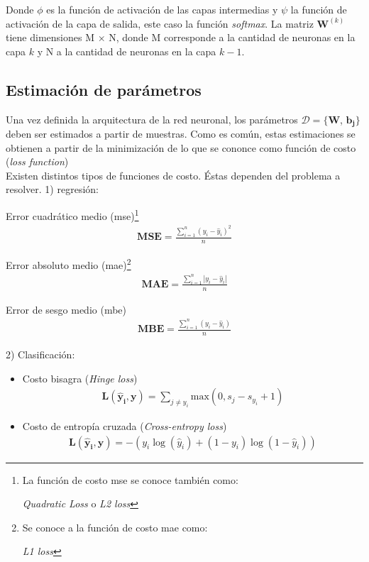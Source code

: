 \indent Donde $\phi$ es la función de activación de las capas intermedias y $\psi$ la función de activación de la
capa de salida, este caso la función \textit{softmax}. La matriz $\bm{W}^{(k)}$ tiene dimensiones  M $\times$ N,
donde M corresponde a la cantidad de neuronas en la capa $k$ y N a la cantidad de neuronas en la capa $k-1$.

\subsection*{Estimación de parámetros}

\indent Una vez definida la arquitectura de la red neuronal, los parámetros $\mathcal{D} = \{\bm{W}$, $\bm{b_j}\}$
deben ser estimados a partir de muestras. Como es común, estas estimaciones se obtienen a partir de la minimización
de lo que se cononce como función de costo (\textit{loss function}) \\
\indent Existen distintos tipos de funciones de costo. Éstas dependen del problema a resolver. 1) regresión:
\begin{itemize}
  \item Error cuadrático medio (\acrshort{mse})\footnote{La función de costo \acrshort{mse} se conoce también como:
  \item \textit{Quadratic Loss} o \textit{L2 loss}}
  \begin{align}
    \mathbf{MSE} = \frac{\sum_{i=1}^n (y_i - \hat{y}_i)^2}{n}
  \end{align}

  \item Error absoluto medio (\acrshort{mae})\footnote{Se conoce a la función de costo \acrshort{mae} como:
  \item \textit{L1 loss}}
  \begin{align}
    \mathbf{MAE} = \frac{\sum_{i=1}^n |y_i - \hat{y}_i|}{n}
  \end{align}

  \item Error de sesgo medio (\acrshort{mbe})
  \begin{align}
    \mathbf{MBE} = \frac{\sum_{i=1}^n (y_i - \hat{y}_i)}{n}
  \end{align}
\end{itemize}
2) Clasificación:

\begin{itemize}
  \item Costo bisagra (\textit{Hinge loss})
  \begin{align}
    \mathbf{L(\hat{y}_i,y)} = \sum_{j \neq y_i} \mathrm{max}(0, s_j-s_{y_i}+1)
  \end{align}

  \item Costo de entropía cruzada (\textit{Cross-entropy loss})
  \begin{align}
    \mathbf{L(\hat{y}_i,y)} = -(y_i \log(\hat{y}_i) + (1-y_i)\log(1-\hat{y}_i))
  \end{align}
\end{itemize}


